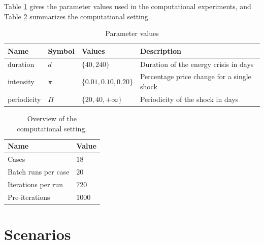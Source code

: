 Table \ref{Table: parameter settings} gives the parameter values used in the
computational experiments, and Table \ref{Table: computational setting} summarizes the computational
setting.

\begin{table}[tbp]
\caption{Parameter values}
\centering
\begin{tabular}{llll}
\hline\hline
Name & Symbol & Values & Description \\ \hline
duration & $d$ & $\{40, 240\}$ & Duration of the energy crisis in days \\
intensity & $\pi$ & $\{0.01, 0.10, 0.20\}$ & Percentage price change for a
single shock \\
periodicity & $\Pi$ & $\{20, 40, +\infty\}$ & Periodicity of the shock in days%
\end{tabular}%
\label{Table: parameter settings}
\end{table}

\begin{table}[tbp]
\caption{Overview of the computational setting.}
\label{Table: computational setting}
\centering
\begin{tabular}{ll}
\hline\hline
Name & Value \\ \hline
Cases & $18$ \\
Batch runs per case & $20$ \\
Iterations per run & $720$ \\
Pre-iterations & $1000$ \\ \hline
\end{tabular}%
\end{table}

\section{Scenarios}
% 